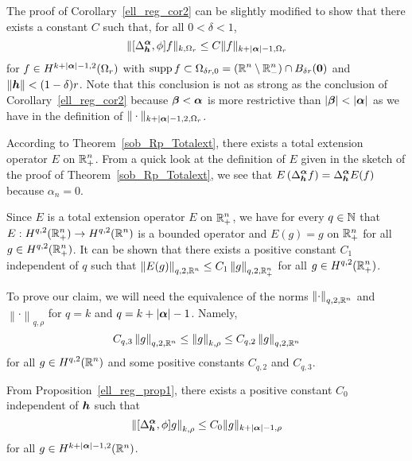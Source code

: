 \begin{rmk}
The proof of Corollary~\ref{ell_reg_cor2} can be slightly modified
to show that there exists a constant $C$ such that, for all $0 < \delta <1$, 
\[
  \| [\Delta^{{\bm{\alpha}}}_{{\bm{h}}}, \phi] f \|_{k,\Omega_r}
\leq C \| f \|_{k+|{\bm{\alpha}}|-1,\Omega_r}
\]
for $f \in H^{k+|{\bm{\alpha}}|-1,2}(\Omega_r)$ with
$\displaystyle \operatorname{supp} f \subset \Omega_{\delta r,0}
= (\mathbb{R}^n \setminus \mathbb{R}^n_-) \cap B_{\delta r}({\bm{0}})$ and
$\|{\bm{h}}\|<(1-\delta)r$.
Note that this conclusion is not as strong as the conclusion of
Corollary~\ref{ell_reg_cor2} because ${\bm{\beta}} < {\bm{\alpha}}$ is more
restrictive than $|{\bm{\beta}}| < |{\bm{\alpha}}|$ as we have in the
definition of $\displaystyle \| \cdot \|_{k+|{\bm{\alpha}}|-1,2,\Omega_r}$.

According to Theorem~\ref{sob_Rp_Totalext}, there exists a total
extension operator $E$ on $\displaystyle \mathbb{R}^n_+ $.  From a quick look
at the definition of $E$ given in the sketch of the proof of
Theorem~\ref{sob_Rp_Totalext}, we see
that $\displaystyle E\left( \Delta^{{\bm{\alpha}}}_{{\bm{h}}} f\right) =
\Delta^{{\bm{\alpha}}}_{{\bm{h}}} E(f)$ because $\alpha_n=0$.

Since $E$ is a total extension operator $E$ on $\displaystyle \mathbb{R}^n_+ $, we
have for every $q \in \mathbb{N}$ that
$\displaystyle E:H^{q,2}(\mathbb{R}^n_+) \to H^{q,2}(\mathbb{R}^n)$ is a
bounded operator and $E(g) = g$ on $\mathbb{R}^n_+$ for all
$\displaystyle g \in H^{q,2}(\mathbb{R}^n_+)$.  It can be
shown that there exists a positive constant $C_1$ independent of $q$ such that
$\displaystyle \left\| E(g) \right\|_{q,2,\mathbb{R}^n} \leq C_1
\left\| g \right\|_{q,2,\mathbb{R}^n_+}$ for all $\displaystyle g \in H^{q,2}(\mathbb{R}^n_+)$.

To prove our claim, we will need the equivalence of the norms
$\displaystyle \left\|\cdot\right\|_{q,2,\mathbb{R}^n}$ and 
$\displaystyle \left\|\cdot\right\|_{q,\rho}$ for $q=k$ and
$q=k+|{\bm{\alpha}}|-1$.
Namely,
\[
C_{q,3} \left\|g \right\|_{q,2,\mathbb{R}^n} \leq \left\|g \right\|_{k,\rho}
\leq C_{q,2} \left\|g \right\|_{q,2,\mathbb{R}^n}
\]
for all $\displaystyle g \in H^{q,2}(\mathbb{R}^n)$ and some positive
constants $C_{q,2}$ and $C_{q,3}$.

From Proposition~\ref{ell_reg_prop1}, there exists a positive constant $C_0$
independent of ${\bm{h}}$ such that
\[
\left\| [\Delta^{{\bm{\alpha}}}_{{\bm{h}}}, \phi] g \right\|_{k,\rho}
\leq C_0 \| g \|_{k+|{\bm{\alpha}}|-1,\rho}
\]
for all $g \in H^{k+|{\bm{\alpha}}|-1,2}(\mathbb{R}^n)$.


\end{rmk}
